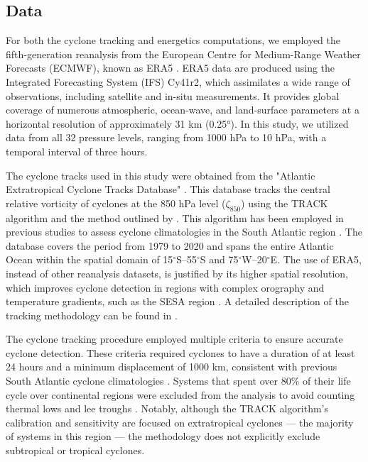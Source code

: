\documentclass[pdflatex,sn-chicago]{sn-jnl}%
\theoremstyle{plain}
\theoremstyle{definition}
\theoremstyle{remark}
\theoremstyle{definition}
\begin{document}
\subsection{Data}\label{sec:data}

For both the cyclone tracking and energetics computations, we employed the fifth-generation reanalysis from the European Centre for Medium-Range Weather Forecasts (ECMWF), known as ERA5 \citep{hersbach2020era5}. ERA5 data are produced using the Integrated Forecasting System (IFS) Cy41r2, which assimilates a wide range of observations, including satellite and in-situ measurements. It provides global coverage of numerous atmospheric, ocean-wave, and land-surface parameters at a horizontal resolution of approximately 31 km (0.25°). In this study, we utilized data from all 32 pressure levels, ranging from 1000 hPa to 10 hPa, with a temporal interval of three hours.

The cyclone tracks used in this study were obtained from the "Atlantic Extratropical Cyclone Tracks Database" \citep{gramcianinov2020data}. This database tracks the central relative vorticity of cyclones at the 850 hPa level (\(\zeta_{850}\)) using the TRACK algorithm \citep{hodges1994general, hodges1995feature} and the method outlined by \citet{hoskins2002new}. This algorithm has been employed in previous studies to assess cyclone climatologies in the South Atlantic region \citep{gramcianinov2019properties,gramcianinov2020analysis,couto2024new}. The database covers the period from 1979 to 2020 and spans the entire Atlantic Ocean within the spatial domain of 15\(^\circ\)S–55\(^\circ\)S and 75\(^\circ\)W–20\(^\circ\)E. The use of ERA5, instead of other reanalysis datasets, is justified by its higher spatial resolution, which improves cyclone detection in regions with complex orography and temperature gradients, such as the SESA region \citep{gramcianinov2020analysis}. A detailed description of the tracking methodology can be found in \citet{gramcianinov2020analysis}.

The cyclone tracking procedure employed multiple criteria to ensure accurate cyclone detection. These criteria required cyclones to have a duration of at least 24 hours and a minimum displacement of 1000 km, consistent with previous South Atlantic cyclone climatologies \citep{sinclair1995climatology,gramcianinov2019properties}. Systems that spent over 80\% of their life cycle over continental regions were excluded from the analysis to avoid counting thermal lows and lee troughs \citep[e.g.][]{crespo2021potential}. Notably, although the TRACK algorithm's calibration and sensitivity are focused on extratropical cyclones — the majority of systems in this region \citep{marrafon2022classificaccao} — the methodology does not explicitly exclude subtropical or tropical cyclones.  
\end{document}
